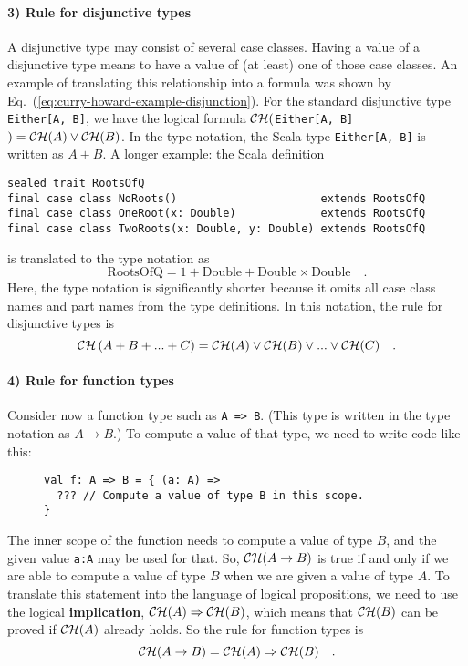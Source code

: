 \paragraph{3) Rule for disjunctive types}

A disjunctive type may consist of several case classes. Having a value
of a disjunctive type means to have a value of (at least) one of those
case classes. An example of translating this relationship into a formula
was shown by Eq.~(\ref{eq:curry-howard-example-disjunction}). For
the standard disjunctive type \lstinline!Either[A, B]!, we have the
logical formula ${\cal CH}($\lstinline!Either[A, B]!$)={\cal CH}(A)\vee{\cal CH}(B)$.
In the type notation, the Scala type \lstinline!Either[A, B]! is
written as $A+B$. A longer example: the Scala definition
\begin{lstlisting}
sealed trait RootsOfQ
final case class NoRoots()                      extends RootsOfQ
final case class OneRoot(x: Double)             extends RootsOfQ
final case class TwoRoots(x: Double, y: Double) extends RootsOfQ
\end{lstlisting}
is translated to the type notation as
\[
\text{RootsOfQ}=1+\text{Double}+\text{Double}\times\text{Double}\quad.
\]
Here, the type notation is significantly shorter because it omits
all case class names and part names from the type definitions. In
this notation, the rule for disjunctive types is
\[
{\cal CH}\left(A+B+...+C\right)={\cal CH}(A)\vee{\cal CH}(B)\vee...\vee{\cal CH}(C)\quad.
\]


\paragraph{4) Rule for function types}

Consider now a function type such as \lstinline!A => B!. (This type
is written in the type notation as $A\rightarrow B$.) To compute
a value of that type, we need to write code like this:

\begin{wrapfigure}{l}{0.5\columnwidth}%
\vspace{-0.65\baselineskip}
\begin{lstlisting}
val f: A => B = { (a: A) =>
  ??? // Compute a value of type B in this scope.
}
\end{lstlisting}

\vspace{-0.9\baselineskip}
\end{wrapfigure}%

\noindent The inner scope of the function needs to compute a value
of type $B$, and the given value \lstinline!a:A! may be used for
that. So, ${\cal CH}(A\rightarrow B)$ is true if and only if we are
able to compute a value of type $B$ when we are given a value of
type $A$. To translate this statement into the language of logical
propositions, we need to use the logical
\textbf{implication}, ${\cal CH}(A)\Rightarrow{\cal CH}(B)$, which
means that ${\cal CH}(B)$ can be proved if ${\cal CH}(A)$ already
holds. So the rule for function types is
\[
{\cal CH}(A\rightarrow B)={\cal CH}(A)\Rightarrow{\cal CH}(B)\quad.
\]



